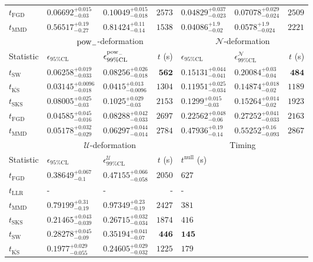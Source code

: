 \begin{tabular}{l|llr|llr}
	$t_{\mathrm{FGD}}$ & ${\mathbf{0.06692_{-0.03}^{+0.015}}}$ & ${\mathbf{0.10049_{-0.018}^{+0.015}}}$ & $2573$ & $0.04829_{-0.023}^{+0.037}$ & $0.07078_{-0.024}^{+0.029}$ & $2509$ \\
	$t_{\mathrm{MMD}}$ & $0.56517_{-0.27}^{+0.19}$ & $0.81424_{-0.14}^{+0.11}$ & $1538$ & $0.04086_{-0.02}^{+1.9}$ & $0.0578_{-0.024}^{+1.9}$ & $2221$ \\
	\toprule
	\multicolumn{1}{c}{} & \multicolumn{3}{c}{$\rm{pow}_{-}$-deformation} & \multicolumn{3}{c}{$\mathcal{N}$-deformation} \\
	Statistic & $\epsilon_{95\%\mathrm{CL}}$ & $\epsilon^  {\rm{pow}_{-}}_{99\%\mathrm{CL}}$ & $t$ (s) & $\epsilon_{95\%\mathrm{CL}}$ & $\epsilon^    {\mathcal{N}}_{99\%\mathrm{CL}}$ & $t$ (s) \\
	\midrule
	$t_{\mathrm{SW}}$ & $0.06258_{-0.033}^{+0.019}$ & $0.08256_{-0.018}^{+0.026}$ & ${\mathbf{562}}$ & $0.15131_{-0.041}^{+0.044}$ & $0.20084_{-0.04}^{+0.03}$ & ${\mathbf{484}}$ \\
	$t_{\overline{\mathrm{KS}}}$ & ${\mathbf{0.03145_{-0.018}^{+0.0096}}}$ & ${\mathbf{0.0415_{-0.0096}^{+0.013}}}$ & $1304$ & ${\mathbf{0.11951_{-0.034}^{+0.025}}}$ & ${\mathbf{0.14874_{-0.02}^{+0.018}}}$ & $1189$ \\
	$t_{\mathrm{SKS}}$ & $0.08005_{-0.03}^{+0.025}$ & $0.1025_{-0.03}^{+0.029}$ & $2153$ & $0.1299_{-0.03}^{+0.015}$ & $0.15264_{-0.02}^{+0.014}$ & $1923$ \\
	$t_{\mathrm{FGD}}$ & $0.04585_{-0.016}^{+0.045}$ & $0.08288_{-0.033}^{+0.042}$ & $2697$ & $0.22562_{-0.06}^{+0.048}$ & $0.27252_{-0.033}^{+0.041}$ & $2163$ \\
	$t_{\mathrm{MMD}}$ & $0.05178_{-0.029}^{+0.032}$ & $0.06297_{-0.014}^{+0.044}$ & $2784$ & $0.47936_{-0.14}^{+0.19}$ & $0.55252_{-0.093}^{+0.16}$ & $2867$ \\
	\toprule
	\multicolumn{1}{c}{} & \multicolumn{3}{c}{$\mathcal{U}$-deformation} & \multicolumn{3}{c}{Timing} \\
	Statistic & $\epsilon_{95\%\mathrm{CL}}$ & $\epsilon^    {\mathcal{U}}_{99\%\mathrm{CL}}$ & $t$ (s) & $t^{\mathrm{null}}$ (s) \\
	\midrule
	$t_{\mathrm{FGD}}$ & $0.38649_{-0.1}^{+0.067}$ & $0.47155_{-0.058}^{+0.066}$ & $2050$ & $627$ \\
	$t_{\mathrm{LLR}}$ & - & - & - & - \\
	$t_{\mathrm{MMD}}$ & $0.79199_{-0.19}^{+0.31}$ & $0.97349_{-0.19}^{+0.23}$ & $2427$ & $381$ \\
	$t_{\mathrm{SKS}}$ & $0.21465_{-0.039}^{+0.043}$ & $0.26715_{-0.034}^{+0.032}$ & $1874$ & $416$ \\
	$t_{\mathrm{SW}}$ & $0.28278_{-0.09}^{+0.045}$ & $0.35194_{-0.07}^{+0.041}$ & ${\mathbf{446}}$ & ${\mathbf{145}}$ \\
	$t_{\overline{\mathrm{KS}}}$ & ${\mathbf{0.1977_{-0.055}^{+0.029}}}$ & ${\mathbf{0.24605_{-0.032}^{+0.029}}}$ & $1225$ & $179$ \\
	\bottomrule
\end{tabular}